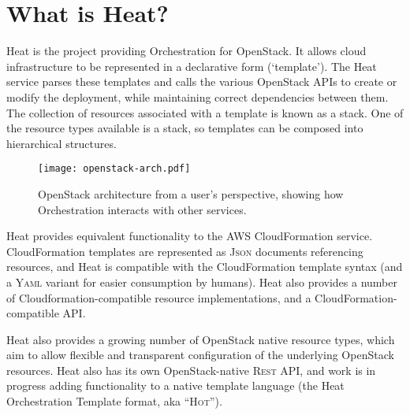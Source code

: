 \section{What is Heat?}

Heat is the project providing Orchestration for OpenStack. It allows cloud infrastructure to be represented in a declarative form (`template'). The Heat service parses these templates and calls the various OpenStack APIs to create or modify the deployment, while maintaining correct dependencies between them. The collection of resources associated with a template is known as a stack. One of the resource types available is a stack, so templates can be composed into hierarchical structures.

\begin{figure}[b!]
\centering
\texttt{[image: openstack-arch.pdf]}
\caption{OpenStack architecture from a user's perspective, showing how Orchestration interacts with other services.}
\label{fig:openstack-arch}
\end{figure}

Heat provides equivalent functionality to the AWS CloudFormation service. CloudFormation templates are represented as \textsc{Json} documents referencing resources, and Heat is compatible with the CloudFormation template syntax (and a \textsc{Yaml} variant for easier consumption by humans).  Heat also provides a number of Cloudformation-compatible resource implementations, and a CloudFormation-compatible API.

Heat also provides a growing number of OpenStack native resource types, which aim to allow flexible and transparent configuration of the underlying OpenStack resources. Heat also has its own OpenStack-native \textsc{Rest} API, and work is in progress adding functionality to a native template language (the Heat Orchestration Template format, aka ``\textsc{Hot}'').
